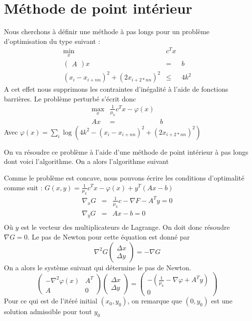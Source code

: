 \section{Méthode de point intérieur}

Nous cherchons à définir une méthode à pas longs pour un problème d'optimisation du type suivant :
\begin{eqnarray*}
\min_{x} & c^Tx &\\
\begin{pmatrix} A \end{pmatrix}
x & = &b \\
(x_i-x_{i+nn})^2+(2x_{i+2*nn})^2 & \leq & 4k^2 
\end{eqnarray*}
A cet effet nous supprimons les contraintes d'inégalité à l'aide de fonctions barrières. Le problème perturbé s'écrit donc
\begin{eqnarray*}
\max_{x}  & \frac{1}{\mu_k}c^Tx - \varphi(x)& \\
Ax & = & b
\end{eqnarray*}
Avec $\varphi(x) = \sum_{i} \log(4k^2 - (x_i-x_{i+nn})^2+(2x_{i+2*nn})^2)$

On va résoudre ce problème à l'aide d'une méthode de point intérieur à pas longs dont voici l'algorithme.
On a alors l'algorithme suivant
\begin{algorithm}[!h]

\end{algorithm}


Comme le problème est concave, nous pouvons écrire les conditions d'optimalité comme suit :
$G(x,y) = \frac{1}{\mu_k}c^Tx -\varphi(x) +y^T(Ax-b)$
\begin{eqnarray*}
\nabla_{x}G & = & \frac{1}{\mu_k}c -\nabla F-A^Ty = 0 \\
\nabla_{y}G & = & Ax-b= 0 \\
\end{eqnarray*}
Où $y$ est le vecteur des multiplicateurs de Lagrange. On doit donc résoudre $\nabla G=0 $. Le pas de Newton pour cette équation est donné par 
$$
\nabla^2G  \begin{pmatrix}
\Delta x \\ \Delta y
\end{pmatrix}
= 
-\nabla G
$$
On a alors le système suivant qui détermine le pas de Newton. 
$$\begin{pmatrix}
-\nabla^2 \varphi(x) & A^T \\
A & 0
\end{pmatrix} \begin{pmatrix}
\Delta x \\ \Delta y
\end{pmatrix} = \begin{pmatrix}
-(\frac{1}{\mu_k}-\nabla \varphi + A^Ty)\\
0
\end{pmatrix}$$
Pour ce qui est de l'itéré initial $(x_0,y_0)$, on remarque que $(0,y_0)$ est une solution admissible pour tout $y_0$